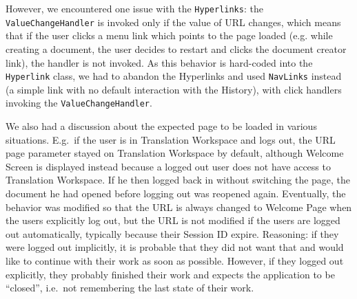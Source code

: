{However, we encountered one issue with the {\tt Hyperlinks}: the {\tt ValueChangeHandler} is invoked only if the value of URL changes, which means that if the user clicks a menu link which points to the page loaded (e.g. while creating a document, the user decides to restart and clicks the document creator link), the handler is not invoked. As this behavior is hard-coded into the {\tt Hyperlink} class, we had to abandon the Hyperlinks and used {\tt NavLinks} instead (a simple link with no default interaction with the History), with click handlers invoking the {\tt ValueChangeHandler}.




We also had a discussion about the expected page to be loaded in various situations. E.g.\ if the user is in Translation Workspace and logs out, the URL page parameter stayed on Translation Workspace by default, although Welcome Screen is displayed instead because a logged out user does not have access to Translation Workspace. If he then logged back in without switching the page, the document he had opened before logging out was reopened again.
Eventually, the behavior was modified so that the URL is always changed to Welcome Page when the users explicitly log out, but the URL is not modified if the users are logged out automatically, typically because their Session ID expire. Reasoning: if they were logged out implicitly, it is probable that they did not want that and would like to continue with their work as soon as possible. However, if they logged out explicitly, they probably finished their work and expects the application to be ``closed'', i.e.\ not remembering the last state of their work.


}
